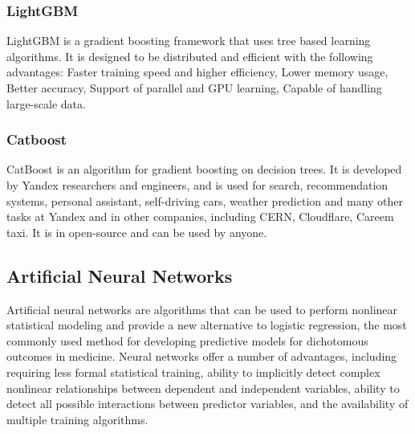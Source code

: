 \subsubsection{LightGBM}

LightGBM is a gradient boosting framework that uses tree based learning algorithms. It is designed to be distributed and efficient with the following advantages: Faster training speed and higher efficiency,
Lower memory usage,
Better accuracy,
Support of parallel and GPU learning,
Capable of handling large-scale data. \cite{lgbm}

\subsubsection{Catboost}

CatBoost is an algorithm for gradient boosting on decision trees. It is developed by Yandex researchers and engineers, and is used for search, recommendation systems, personal assistant, self-driving cars, weather prediction and many other tasks at Yandex and in other companies, including CERN, Cloudflare, Careem taxi. It is in open-source and can be used by anyone. \cite{cat}

\subsection{Artificial Neural Networks}

Artificial neural networks are algorithms that can be used to perform nonlinear statistical modeling and provide a new alternative to logistic regression, the most commonly used method for developing predictive models for dichotomous outcomes in medicine. Neural networks offer a number of advantages, including requiring less formal statistical training, ability to implicitly detect complex nonlinear relationships between dependent and independent variables, ability to detect all possible interactions between predictor variables, and the availability of multiple training algorithms. \cite{neuralnets}